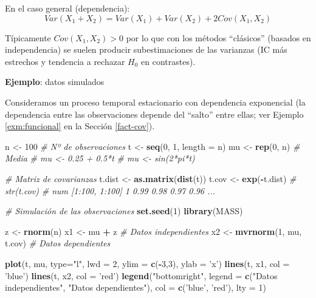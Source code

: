 \documentclass[
]{book}
\newenvironment{Shaded}{\begin{snugshade}}{\end{snugshade}}
\newcommand{\CommentTok}[1]{\textcolor[rgb]{0.56,0.35,0.01}{\textit{#1}}}
\newcommand{\DataTypeTok}[1]{\textcolor[rgb]{0.13,0.29,0.53}{#1}}
\newcommand{\DecValTok}[1]{\textcolor[rgb]{0.00,0.00,0.81}{#1}}
\newcommand{\KeywordTok}[1]{\textcolor[rgb]{0.13,0.29,0.53}{\textbf{#1}}}
\newcommand{\NormalTok}[1]{#1}
\newcommand{\OperatorTok}[1]{\textcolor[rgb]{0.81,0.36,0.00}{\textbf{#1}}}
\newcommand{\StringTok}[1]{\textcolor[rgb]{0.31,0.60,0.02}{#1}}
\theoremstyle{break}
\theoremstyle{definition}
\theoremstyle{definition}
\theoremstyle{definition}
\theoremstyle{remark}
\begin{document}
En el caso general (dependencia):
\[Var(X_{1}+X_{2})=Var(X_{1})+Var(X_{2})+2Cov(X_{1},X_{2})\]

Típicamente \(Cov(X_{1},X_{2})>0\) por lo que con los métodos
``clásicos'' (basados en independencia) se suelen producir
subestimaciones de las varianzas (IC más estrechos y tendencia a
rechazar \(H_{0}\) en contrastes).

\textbf{Ejemplo}: datos simulados

Consideramos un proceso temporal estacionario con dependencia exponencial
(la dependencia entre las observaciones depende del ``salto'' entre ellas;
ver Ejemplo \ref{exm:funcional} en la Sección \ref{fact-cov}).

\begin{Shaded}
\begin{Highlighting}[]
\NormalTok{n <-}\StringTok{ }\DecValTok{100}          \CommentTok{# Nº de observaciones}
\NormalTok{t <-}\StringTok{ }\KeywordTok{seq}\NormalTok{(}\DecValTok{0}\NormalTok{, }\DecValTok{1}\NormalTok{, }\DataTypeTok{length =}\NormalTok{ n)}
\NormalTok{mu <-}\StringTok{ }\KeywordTok{rep}\NormalTok{(}\DecValTok{0}\NormalTok{, n)   }\CommentTok{# Media}
\CommentTok{# mu <- 0.25 + 0.5*t}
\CommentTok{# mu <- sin(2*pi*t)}

\CommentTok{# Matriz de covarianzas}
\NormalTok{t.dist <-}\StringTok{ }\KeywordTok{as.matrix}\NormalTok{(}\KeywordTok{dist}\NormalTok{(t))}
\NormalTok{t.cov <-}\StringTok{ }\KeywordTok{exp}\NormalTok{(}\OperatorTok{-}\NormalTok{t.dist)}
\CommentTok{# str(t.cov)}
\CommentTok{# num [1:100, 1:100] 1 0.99 0.98 0.97 0.96 ...}

\CommentTok{# Simulación de las observaciones}
\KeywordTok{set.seed}\NormalTok{(}\DecValTok{1}\NormalTok{)}
\KeywordTok{library}\NormalTok{(MASS)}

\NormalTok{z <-}\StringTok{ }\KeywordTok{rnorm}\NormalTok{(n)}
\NormalTok{x1 <-}\StringTok{ }\NormalTok{mu }\OperatorTok{+}\StringTok{ }\NormalTok{z }\CommentTok{# Datos independientes}
\NormalTok{x2 <-}\StringTok{ }\KeywordTok{mvrnorm}\NormalTok{(}\DecValTok{1}\NormalTok{, mu, t.cov) }\CommentTok{# Datos dependientes}

\KeywordTok{plot}\NormalTok{(t, mu, }\DataTypeTok{type=}\StringTok{"l"}\NormalTok{, }\DataTypeTok{lwd =} \DecValTok{2}\NormalTok{, }\DataTypeTok{ylim =} \KeywordTok{c}\NormalTok{(}\OperatorTok{-}\DecValTok{3}\NormalTok{,}\DecValTok{3}\NormalTok{), }\DataTypeTok{ylab =} \StringTok{'x'}\NormalTok{)}
\KeywordTok{lines}\NormalTok{(t, x1, }\DataTypeTok{col =} \StringTok{'blue'}\NormalTok{)}
\KeywordTok{lines}\NormalTok{(t, x2, }\DataTypeTok{col =} \StringTok{'red'}\NormalTok{)}
\KeywordTok{legend}\NormalTok{(}\StringTok{"bottomright"}\NormalTok{, }\DataTypeTok{legend =} \KeywordTok{c}\NormalTok{(}\StringTok{"Datos independientes"}\NormalTok{, }\StringTok{"Datos dependientes"}\NormalTok{), }\DataTypeTok{col =} \KeywordTok{c}\NormalTok{(}\StringTok{'blue'}\NormalTok{, }\StringTok{'red'}\NormalTok{), }\DataTypeTok{lty =} \DecValTok{1}\NormalTok{)}
\end{Highlighting}
\end{Shaded}
\end{document}
